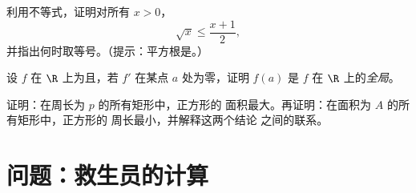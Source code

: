 \begin{exercise}[$\star\star$]\label{exo:g12:deriv:7}
利用不等式，证明对所有 $x > 0$，
\[
\sqrt{x} \leq \frac{x + 1}{2},
\]
并指出何时取等号。（提示：平方根是。）
\end{exercise}

\begin{exercise}[$\star\star\star$]\label{exo:g12:deriv:8}
设 $f$ 在 $\R$ 上为且，若 $f'$
在某点 $a$ 处为零，证明 $f(a)$ 是 $f$ 在
$\R$ 上的\emph{全局}。
\end{exercise}

\begin{exercise}[$\star\star\star$]\label{exo:g12:deriv:9}
证明：在周长为 $p$ 的所有矩形中，正方形的
面积最大。再证明：在面积为 $A$ 的所有矩形中，正方形的
周长最小，并解释这两个结论
之间的联系。
\end{exercise}

\section{问题：救生员的计算}

